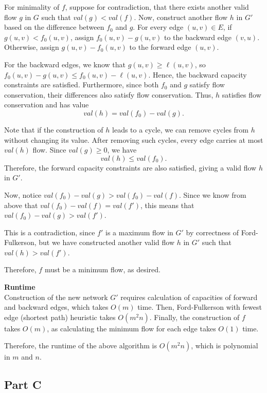 \documentclass[11pt]{exam}
\begin{document}
For minimality of $f$, suppose for contradiction, that there exists
another valid flow $g$ in $G$ such that $\mathit{val}(g) < \mathit{val}(f)$.
Now, construct another flow $h$ in $G'$ based on the difference
between $f_0$ and $g$. For every edge $(u,v) \in E$, if $g(u,v) <
f_0(u,v)$, assign $f_0(u,v)-g(u,v)$ to the backward edge $(v,u)$.
Otherwise, assign $g(u,v)-f_0(u,v)$ to the forward edge $(u,v)$.

For the backward edges, we know that $g(u,v) \geq \ell(u,v)$, so
$f_0(u,v)-g(u,v) \leq f_0(u,v)-\ell(u,v)$. Hence, the backward
capacity constraints are satisfied. Furthermore, since both $f_0$ and
$g$ satisfy flow conservation, their differences also satisfy flow
conservation. Thus, $h$ satisfies flow conservation and has value
\[
  \mathit{val}(h) = \mathit{val}(f_0)-\mathit{val}(g).
\]

Note that if the construction of $h$ leads to a cycle, we can remove cycles from
$h$ without changing its value. After removing such cycles, every edge
carries at most $\mathit{val}(h)$ flow. Since $\mathit{val}(g) \geq 0$, we have
\[
  \mathit{val}(h) \leq \mathit{val}(f_0).
\]
Therefore, the forward capacity constraints are also satisfied,
giving a valid flow $h$ in $G'$.

Now, notice $\mathit{val}(f_0) - \mathit{val}(g) > \mathit{val}(f_0) -
\mathit{val}(f)$. Since we know from above that $\mathit{val}(f_0) -
\mathit{val}(f) = \mathit{val}(f')$, this means that
$\mathit{val}(f_0) - \mathit{val}(g) > \mathit{val}(f')$.

This is a contradiction, since $f'$ is a maximum flow in $G'$ by
correctness of Ford-Fulkerson, but we have constructed another valid
flow $h$ in $G'$ such that $\mathit{val}(h) > \mathit{val}(f')$.

Therefore, $f$ must be a minimum flow, as desired.

\noindent \textbf{Runtime}\\

Construction of the new network $G'$ requires calculation of
capacities of forward and backward edges, which takes $O(m)$ time.
Then, Ford-Fulkerson with fewest edge (shortest path) heuristic takes
$O(m^2 n)$. Finally, the construction of $f$ takes $O(m)$, as
calculating the minimum flow for each edge takes $O(1)$ time.

Therefore, the runtime of the above algorithm is $ O(m^2 n) $, which
is polynomial in $m$ and $n$.

\subsection{Part C}
\end{document}
